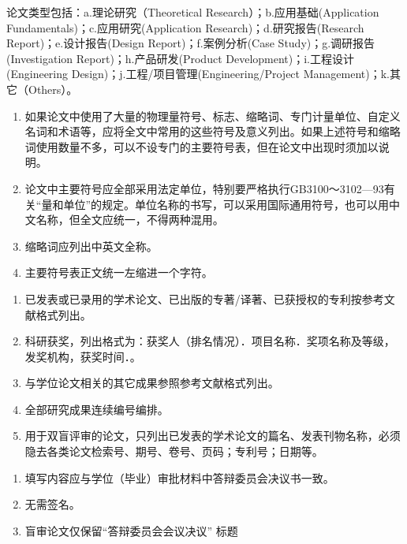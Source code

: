 \begin{tcolorbox}[colback=blue!5!white,colframe=blue!75!black,title=论文类型要求]
  论文类型包括：a.理论研究（Theoretical Research）；b.应用基础(Application Fundamentals)；c.应用研究(Application Research)；d.研究报告(Research Report)；e.设计报告(Design Report)；f.案例分析(Case Study)；g.调研报告(Investigation Report)；h.产品研发(Product Development)；i.工程设计(Engineering Design)；j.工程/项目管理(Engineering/Project Management)；k.其它（Others）。
\end{tcolorbox}


\begin{tcolorbox}[colback=red!5!white,colframe=red!75!black]
  \begin{enumerate}[leftmargin=0.5cm]
    \item 如果论文中使用了大量的物理量符号、标志、缩略词、专门计量单位、自定义名词和术语等，应将全文中常用的这些符号及意义列出。如果上述符号和缩略词使用数量不多，可以不设专门的主要符号表，但在论文中出现时须加以说明。
    \item 论文中主要符号应全部采用法定单位，特别要严格执行GB3100～3102—93有关“量和单位”的规定。单位名称的书写，可以采用国际通用符号，也可以用中文名称，但全文应统一，不得两种混用。
    \item 缩略词应列出中英文全称。
    \item 主要符号表正文统一左缩进一个字符。
  \end{enumerate}
\end{tcolorbox}



\begin{tcolorbox}[colback=red!5!white,colframe=red!75!black]
  \begin{enumerate}[leftmargin=0.5cm]
    \item 已发表或已录用的学术论文、已出版的专著/译著、已获授权的专利按参考文献格式列出。
    \item 科研获奖，列出格式为：获奖人（排名情况）．项目名称．奖项名称及等级，发奖机构，获奖时间．。
    \item 与学位论文相关的其它成果参照参考文献格式列出。
    \item 全部研究成果连续编号编排。
    \item 用于双盲评审的论文，只列出已发表的学术论文的篇名、发表刊物名称，必须隐去各类论文检索号、期号、卷号、页码；专利号；日期等。
  \end{enumerate}
\end{tcolorbox}




\begin{tcolorbox}[colback=red!5!white,colframe=red!75!black]
  \begin{enumerate}[leftmargin=0.5cm]
    \item 填写内容应与学位（毕业）审批材料中答辩委员会决议书一致。
    \item 无需签名。
    \item 盲审论文仅保留“答辩委员会会议决议” 标题
  \end{enumerate}
\end{tcolorbox}